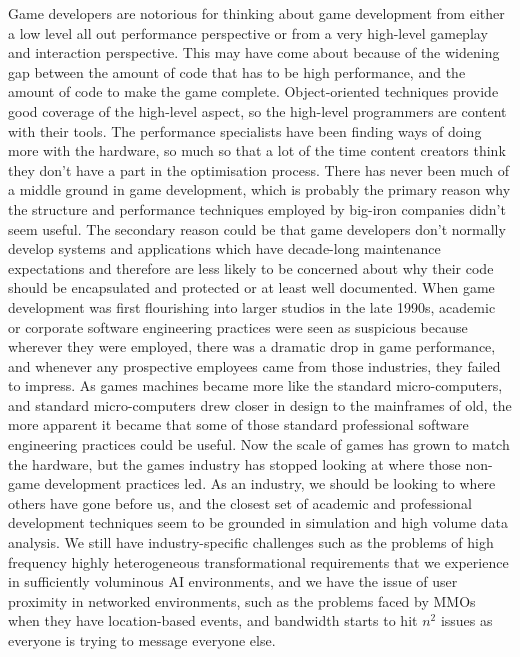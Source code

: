 \documentclass[a4paper,12pt]{book}
\begin{document}
Game developers are notorious for thinking about game development from either a low level all out performance perspective or from a very high-level gameplay and interaction perspective.
This may have come about because of the widening gap between the amount of code that has to be high performance, and the amount of code to make the game complete.
Object-oriented techniques provide good coverage of the high-level aspect, so the high-level programmers are content with their tools.
The performance specialists have been finding ways of doing more with the hardware, so much so that a lot of the time content creators think they don't have a part in the optimisation process.
There has never been much of a middle ground in game development, which is probably the primary reason why the structure and performance techniques employed by big-iron companies didn't seem useful.
The secondary reason could be that game developers don't normally develop systems and applications which have decade-long maintenance expectations and therefore are less likely to be concerned about why their code should be encapsulated and protected or at least well documented.
When game development was first flourishing into larger studios in the late 1990s, academic or corporate software engineering practices were seen as suspicious because wherever they were employed, there was a dramatic drop in game performance, and whenever any prospective employees came from those industries, they failed to impress.
As games machines became more like the standard micro-computers, and standard micro-computers drew closer in design to the mainframes of old, the more apparent it became that some of those standard professional software engineering practices could be useful.
Now the scale of games has grown to match the hardware, but the games industry has stopped looking at where those non-game development practices led.
As an industry, we should be looking to where others have gone before us, and the closest set of academic and professional development techniques seem to be grounded in simulation and high volume data analysis.
We still have industry-specific challenges such as the problems of high frequency highly heterogeneous transformational requirements that we experience in sufficiently voluminous AI environments, and we have the issue of user proximity in networked environments, such as the problems faced by MMOs when they have location-based events, and bandwidth starts to hit $n^2$ issues as everyone is trying to message everyone else.
\end{document}
